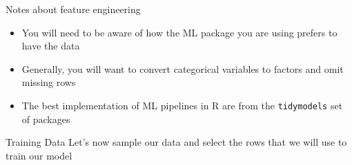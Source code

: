 \documentclass[
  ignorenonframetext,
]{beamer}
\newenvironment{Shaded}{\begin{snugshade}}{\end{snugshade}}
\newcommand{\AttributeTok}[1]{\textcolor[rgb]{0.13,0.29,0.53}{#1}}
\newcommand{\DecValTok}[1]{\textcolor[rgb]{0.00,0.00,0.81}{#1}}
\newcommand{\DocumentationTok}[1]{\textcolor[rgb]{0.56,0.35,0.01}{\textbf{\textit{#1}}}}
\newcommand{\FloatTok}[1]{\textcolor[rgb]{0.00,0.00,0.81}{#1}}
\newcommand{\FunctionTok}[1]{\textcolor[rgb]{0.13,0.29,0.53}{\textbf{#1}}}
\newcommand{\NormalTok}[1]{#1}
\newcommand{\OtherTok}[1]{\textcolor[rgb]{0.56,0.35,0.01}{#1}}
\newcommand{\SpecialCharTok}[1]{\textcolor[rgb]{0.81,0.36,0.00}{\textbf{#1}}}
\providecommand{\tightlist}{%
  \setlength{\itemsep}{0pt}\setlength{\parskip}{0pt}}
\begin{document}
\begin{frame}[fragile]{Notes about feature engineering}
\label{notes-about-feature-engineering}
\begin{itemize}
\tightlist
\item
  You will need to be aware of how the ML package you are using prefers
  to have the data
\item
  Generally, you will want to convert categorical variables to factors
  and omit missing rows
\item
  The best implementation of ML pipelines in R are from the
  \texttt{tidymodels} set of packages
\end{itemize}
\end{frame}

\begin{frame}[fragile]{Training Data}
\label{training-data}
Let's now sample our data and select the rows that we will use to train
our model

\scriptsize

\begin{Shaded}
\end{Shaded}
\end{frame}
\end{document}
